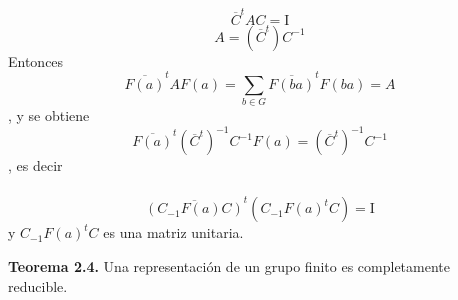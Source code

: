 \documentclass[12pt]{book}
\theoremstyle{definition}
\newcounter{in}
\newcounter{ini}
\begin{document}
\begin{equation*}
  \overline{C}^{t}AC= \mathrm{I}
\end{equation*}
\begin{equation*}
  A=(\overline{C}^{t})C^{-1}
\end{equation*}
Entonces
\begin{equation*}
\overline{F\left(a\right)}^{t}AF\left(a\right)=\sum_{b \in G} \overline{F\left(ba\right)}^{t}F\left(ba\right)=A
\end{equation*},
y se obtiene
\begin{equation*}
\overline{F\left(a\right)}^{t}(\overline{C}^{t})^{-1}C^{-1}F\left(a\right)=(\overline{C}^{t})^{-1}C^{-1}
\end{equation*},
es decir\\~\\
\begin{equation*}
\overline{(C_{-1}F(a)C)}^{t}(C_{-1}F(a)^{t}C)=\mathrm{I}
\end{equation*}
y $C_{-1}F(a)^{t}C$ es una matriz unitaria.

\textbf{Teorema 2.4.} Una representación de un grupo finito es
completamente reducible.
\end{document}
